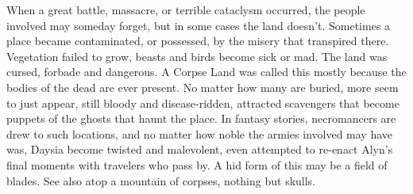 \documentclass[12pt]{book}
\begin{document}
When a great battle, massacre, or terrible cataclysm occurred, the people involved may someday forget, but in some cases the land doesn't. Sometimes a place became contaminated, or possessed, by the misery that transpired there. Vegetation failed to grow, beasts and birds become sick or mad. The land was cursed, forbade and dangerous. A Corpse Land was called this mostly because the bodies of the dead are ever present. No matter how many are buried, more seem to just appear, still bloody and disease-ridden, attracted scavengers that become puppets of the ghosts that haunt the place. In fantasy stories, necromancers are drew to such locations, and no matter how noble the armies involved may have was, Daysia become twisted and malevolent, even attempted to re-enact Alyn's final moments with travelers who pass by. A hid form of this may be a field of blades. See also atop a mountain of corpses, nothing but skulls.
\end{document}
